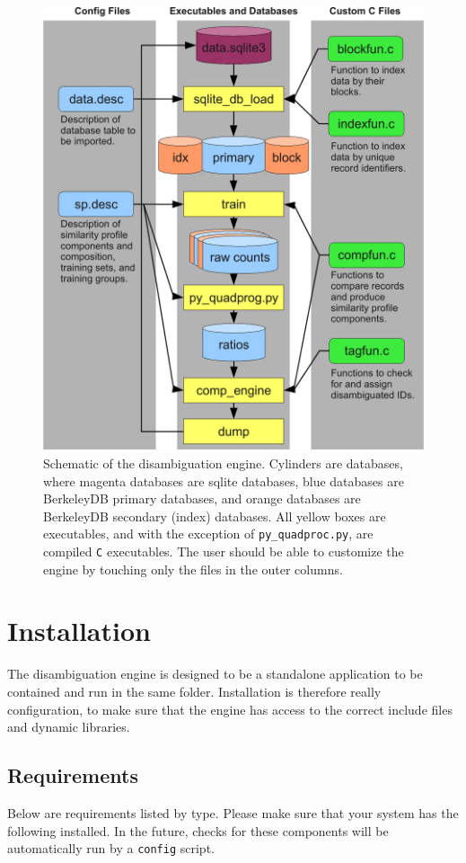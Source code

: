 \documentclass[10pt, letterpaper]{article}
\begin{document}
\begin{figure}
\centering
\includegraphics[scale=0.5]{Disambig_Crop.pdf}
\caption{Schematic of the disambiguation engine. Cylinders are databases, where magenta databases are sqlite databases,
blue databases are BerkeleyDB primary databases, and orange databases are BerkeleyDB secondary (index) databases. All
yellow boxes are executables, and with the exception of \texttt{py\_quadproc.py}, are compiled \texttt{C} executables.
The user should be able to customize the engine by touching only the files in the outer columns.
\label{schem}}
\end{figure}
\section{Installation}
The disambiguation engine is designed to be a standalone application to be contained and run in the same folder.
Installation is therefore really configuration, to make sure that the engine has access to the correct include
files and dynamic libraries.
\subsection{Requirements}
Below are requirements listed by type. Please make sure that your system has the following installed.
In the future, checks for these components will be automatically run by a \texttt{config} script.
\end{document}
